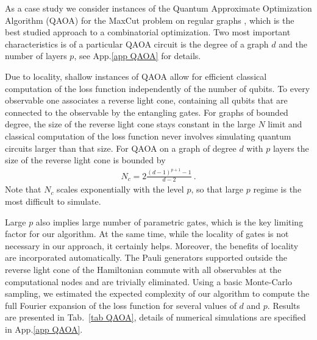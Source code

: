 \documentclass[twocolumn, amsfonts, amssymb, aps, nofootinbib]{revtex4-2}
\begin{document}
As a case study we consider instances of the Quantum Approximate Optimization Algorithm (QAOA) for the MaxCut problem on regular graphs \cite{Farhi2014}, which is the best studied approach to a combinatorial optimization. Two most important characteristics is of a particular QAOA circuit is the degree of a graph $d$ and the number of layers $p$, see App.\ref{app QAOA} for details. 


Due to locality, shallow instances of QAOA allow for efficient classical computation of the loss function independently of the number of qubits. To every observable one associates a reverse light cone, containing all qubits that are connected to the observable by the entangling gates. For graphs of bounded degree, the size of the reverse light cone stays constant in the large $N$ limit and classical computation of the loss function never involves simulating quantum circuits larger than that size. For 
QAOA on a graph of degree $d$ with $p$ layers the size of the reverse light cone is bounded by \cite{Farhi2014}
\begin{align}
	N_c=2\frac{(d-1)^{p+1}-1}{d-2} \ . \label{q QAOA}
\end{align}
Note that $N_c$ scales exponentially with the level $p$, so that large $p$ regime is the most difficult to simulate. 

Large $p$ also implies large number of parametric gates, which is the key limiting factor for our algorithm. At the same time, while the locality of gates is not necessary in our approach, it certainly helps. Moreover, the benefits of locality are incorporated automatically. The Pauli generators supported outside the reverse light cone of the Hamiltonian commute with all observables at the computational nodes and are trivially eliminated. Using a basic Monte-Carlo sampling, we estimated the expected complexity of our algorithm to compute the full Fourier expansion of the loss function for several values of $d$ and $p$. Results are presented in Tab.~\ref{tab QAOA}, details of numerical simulations are specified in App.\ref{app QAOA}. 
\end{document}
